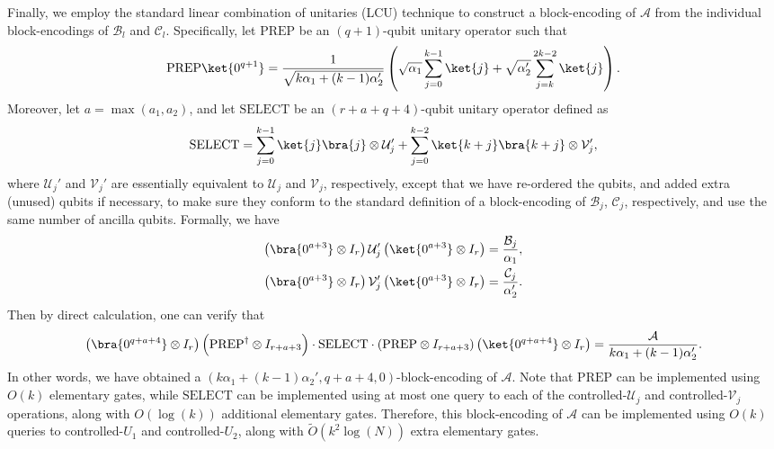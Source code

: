 \documentclass[superscriptaddress,onecolumn,nofootinbib,longbibliography,a4paper,accepted=2026-09-29]{quantumarticle}
\theoremstyle{plain}
\theoremstyle{definition}
\numberwithin{thm}{section}
\numberwithin{assumption}{section}
\numberwithin{lemma}{section}
\numberwithin{prop}{section}
\numberwithin{cor}{section}
\numberwithin{definition}{section}
\numberwithin{rmk}{section}
\numberwithin{equation}{section}
\newcommand{\lrb}[1]{\left ( #1 \right )}
\newcommand{\mylog}[1]{\operatorname{log} \lrb{#1}}
\newcommand{\mymax}[1]{\operatorname{max}\lrb{#1}}
\newcommand{\myO}[1]{O\lrb{#1}}
\newcommand{\mytO}[1]{\tilde{O}\lrb{#1}}
\begin{document}
Finally, we employ the standard linear combination of unitaries (LCU) technique to construct a block-encoding of $\mathcal{A}$ from the individual block-encodings of $\mathcal{B}_l$ and $\mathcal{C}_l$. Specifically, let $\mathrm{PREP}$ be an $(q+1)$-qubit unitary operator such that
\begin{align}
\mathrm{PREP}\ket{0^{q+1}}=\frac{1}{\sqrt{k\alpha_1+(k-1)\alpha_2'}} \lrb{\sqrt{\alpha_1}\sum_{j=0}^{k-1} \ket{j} + \sqrt{\alpha_2'}\sum_{j=k}^{2k-2} \ket{j}}.    
\end{align}
Moreover, let $a=\mymax{a_1, a_2}$, and let $\mathrm{SELECT}$ be an $(r+a+q+4)$-qubit unitary operator defined as
\begin{align}
\mathrm{SELECT} =\sum_{j=0}^{k-1} \ket{j}\bra{j} \otimes \mathcal{U}_j'  
+
\sum_{j=0}^{k-2} \ket{k+j}\bra{k+j} \otimes \mathcal{V}_j',
\end{align}
where $\mathcal{U}_j'$ and $\mathcal{V}_j'$ are essentially equivalent to $\mathcal{U}_j$ and $\mathcal{V}_j$, respectively, except that we have re-ordered the qubits, and added extra (unused) qubits if necessary, to make sure they conform to the standard definition of a block-encoding of $\mathcal{B}_j$, $\mathcal{C}_j$, respectively, and use the same number of ancilla qubits. Formally, we have
\begin{align}
    \lrb{\bra{0^{a+3}} \otimes I_r}\mathcal{U}_j'
    \lrb{\ket{0^{a+3}} \otimes I_r}    
    &=\frac{\mathcal{B}_j}{\alpha_1}, \\
    \lrb{\bra{0^{a+3}} \otimes I_r}\mathcal{V}_j'
    \lrb{\ket{0^{a+3}} \otimes I_r}    
    &=\frac{\mathcal{C}_j}{\alpha_2'}.    
\end{align}
Then by direct calculation, one can verify that
\begin{align}
\lrb{\bra{0^{q+a+4}} \otimes I_{r}} 
\lrb{\mathrm{PREP}^\dagger \otimes I_{r+a+3}}  \cdot 
\mathrm{SELECT} \cdot
\lrb{\mathrm{PREP}  \otimes I_{r+a+3}}  
\lrb{\ket{0^{q+a+4}} \otimes I_{r}}
=\frac{\mathcal{A}}{k\alpha_1+(k-1)\alpha_2'}.
\end{align}
In other words, we have obtained a 
$(k\alpha_1+(k-1)\alpha_2', q+a+4, 0)$-block-encoding of $\mathcal{A}$. Note that $\mathrm{PREP}$ can be implemented using $\myO{k}$ elementary gates, while $\mathrm{SELECT}$ can be implemented using at most 
one query to each of the controlled-$\mathcal{U}_j$ and controlled-$\mathcal{V}_j$ operations, along with $\myO{\mylog{k}}$ additional elementary gates. Therefore, this block-encoding of $\mathcal{A}$ can be implemented using $\myO{k}$ queries to controlled-$U_1$ and controlled-$U_2$, along with $\mytO{k^2 \mylog{N}}$ extra elementary gates.\\
\end{document}
